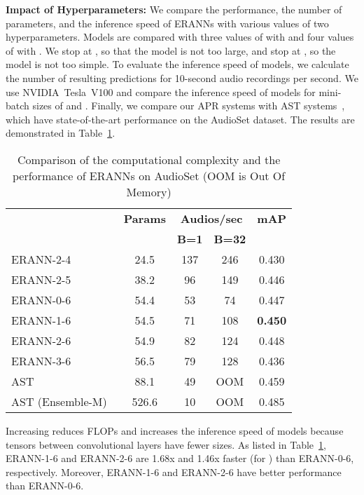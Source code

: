 \documentclass{article}
\begin{document}
\begin{sloppy}
\vspace{3mm}

\noindent \textbf{Impact of Hyperparameters:} We compare the performance, the number of parameters, and the inference speed of ERANNs with various values of two hyperparameters. Models are compared with three values of  with  and four values of  with . We stop at , so that the model is not too large, and stop at , so the model is not too simple. To evaluate the inference speed of models, we calculate the number of resulting predictions for 10-second audio recordings per second. We use \hbox{NVIDIA Tesla V100} and compare the inference speed of models for mini-batch sizes of  and . Finally, we compare our APR systems with AST systems~\cite{gong21b_interspeech}, which have state-of-the-art performance on the AudioSet dataset. The results are demonstrated in Table~\ref{tab:tableeff}.

\vspace{-1.5em}
\begin{table}[h!]
  \caption{Comparison of the computational complexity and the performance of ERANNs on AudioSet (OOM is Out Of Memory)}
  \centering
  \begin{tabular}{lcccc}
  \hline
 & \textbf{Params} & \multicolumn{2}{c}{\textbf{Audios/sec}}  & \textbf{mAP}\\
  &  \textbf{\footnotesize{}} & \textbf{\footnotesize{B=1}}  &\textbf{\footnotesize{B=32}} & \\ \hline 
ERANN-2-4    & 24.5 & 137 &  246  & 0.430 \\  
ERANN-2-5   & 38.2 & 96 & 149  & 0.446  \\ 
ERANN-0-6            & 54.4 & 53 &  74  & 0.447   \\
ERANN-1-6            & 54.5 &  71 & 108   & \textbf{0.450}\\
ERANN-2-6            & 54.9 & 82  &  124  & 0.448     \\
ERANN-3-6            & 56.5 & 79 &   128& 0.436      \\ \hline
AST~\cite{gong21b_interspeech}    & 88.1 &  49 &  \small{OOM}  &  0.459\\
AST (Ensemble-M)~\cite{gong21b_interspeech}  & 526.6 & 10  & \small{OOM}   & 0.485 \\ \hline
  \end{tabular}
  \label{tab:tableeff}
\end{table}

Increasing  reduces FLOPs and increases the inference speed of models because tensors between convolutional layers have fewer sizes. As listed in Table~\ref{tab:tableeff}, \mbox{ERANN-1-6} and \mbox{ERANN-2-6} are 1.68x and 1.46x faster (for ) than \mbox{ERANN-0-6}, respectively. Moreover, \mbox{ERANN-1-6} and \mbox{ERANN-2-6} have better performance than ERANN-0-6.


\end{sloppy}
\end{document}
